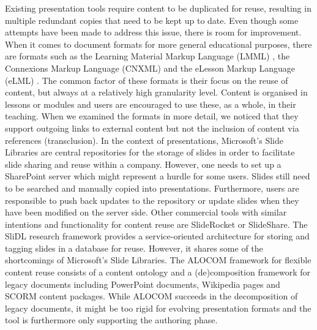     Existing presentation tools require content to be duplicated for reuse,
    resulting in multiple redundant copies that need to be kept up to date.
    Even though some attempts have been made to address this issue, there is
    room for improvement. When it comes to document formats for more general
    educational purposes, there are formats such as the Learning Material
    Markup Language (LMML) \citep{suss-1}, the Connexions Markup Language
    (CNXML) and the eLesson Markup Language (eLML) \citep{fisler-1}. The common
    factor of these formats is their focus on the reuse of content, but always
    at a relatively high granularity level. Content is organised in lessons or
    modules and users are encouraged to use these, as a whole, in their
    teaching. When we examined the formats in more detail, we noticed that they
    support outgoing links to external content but not the inclusion of content
    via references (transclusion). In the context of presentations, Microsoft's
    Slide Libraries are central repositories for the storage of slides in order
    to facilitate slide sharing and reuse within a company. However, one needs
    to set up a SharePoint server which might represent a hurdle for some
    users. Slides still need to be searched and manually copied into
    presentations. Furthermore, users are responsible to push back updates to
    the repository or update slides when they have been modified on the server
    side. Other commercial tools with similar intentions and functionality for
    content reuse are SlideRocket or SlideShare. The SliDL \citep{canos-1}
    research framework provides a service-oriented architecture for storing and
    tagging slides in a database for reuse. However, it shares some of the
    shortcomings of Microsoft's Slide Libraries. The ALOCOM \citep{verbert-1}
    framework for flexible content reuse consists of a content ontology and a
    (de)composition framework for legacy documents including PowerPoint
    documents, Wikipedia pages and SCORM content packages. While ALOCOM
    succeeds in the decomposition of legacy documents, it might be too rigid
    for evolving presentation formats and the tool is furthermore only
    supporting the authoring phase.

